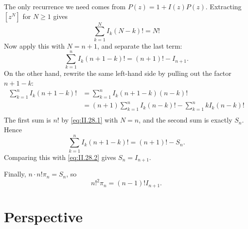 The only recurrence we need comes from $P(z)=1+I(z)P(z)$. Extracting $[z^N]$ for
$N\geq 1$ gives
\begin{equation} \label{eq:II.28.1}
    \sum_{k = 1}^{N} I_{k}(N - k)! = N!
\end{equation}
Now apply this with $N=n+1$, and separate the last term:
\begin{equation} \label{eq:II.28.2}
    \sum_{k = 1}^{n} I_{k}(n + 1 - k)! = (n + 1)! - I_{n + 1}.
\end{equation}
On the other hand, rewrite the same left-hand side by pulling out the factor
$n+1-k$:
\begin{equation*}
    \begin{aligned}
        \sum_{k = 1}^{n} I_{k}(n + 1 - k)!
        &= \sum_{k = 1}^{n} I_{k}(n + 1 - k)(n - k)! \\
        &= (n + 1)\sum_{k = 1}^{n} I_{k}(n - k)! - \sum_{k = 1}^{n} kI_{k}(n - k)! \\
    \end{aligned}
\end{equation*}
The first sum is $n!$ by \eqref{eq:II.28.1} with $N=n$, and the second sum is exactly
$S_n$. Hence
\begin{equation*}
    \sum_{k = 1}^{n} I_{k}(n + 1 - k)! = (n + 1)! - S_n.
\end{equation*}
Comparing this with \eqref{eq:II.28.2} gives $S_n=I_{n+1}$.

Finally, $n \cdot n!\pi_{n} = S_{n}$, so
\begin{equation*}
    n!^{2}\pi_{n} = (n - 1)!I_{n + 1}.
\end{equation*}

\section{Perspective}
